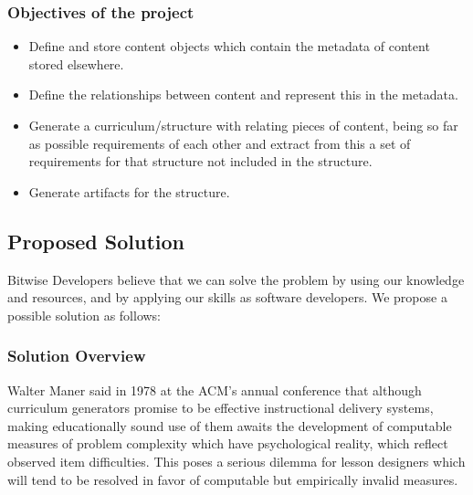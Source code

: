 \documentclass[a4paper]{article}
\begin{document}
			\subsubsection{Objectives of the project}

				\begin{itemize}

					\item Define and store content objects which contain the metadata of content stored elsewhere.

					\item Define the relationships between content and represent this in the metadata.

					\item Generate a curriculum/structure with relating pieces of content, being so far as possible requirements of each other and extract from this a set of requirements for that structure not included in the structure.
                    
                    \item Generate artifacts for the structure.

				\end{itemize}

		\subsection{Proposed Solution}

Bitwise Developers believe that we can solve the problem by using our knowledge and resources, and by applying our skills as software developers. We propose a possible solution as follows:

			\subsubsection{Solution Overview}
Walter Maner said in 1978 at the ACM's annual conference that although curriculum generators promise to be effective instructional delivery systems, making educationally sound use of them awaits the development of computable measures of problem complexity which have psychological reality, which reflect observed item difficulties. This poses a serious dilemma for lesson designers which will tend to be resolved in favor of computable but empirically invalid measures.
\end{document}
